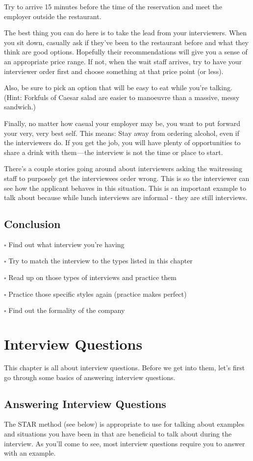 \documentclass{article}
\begin{document}
Try to arrive 15 minutes before the time of the reservation and meet the
employer outside the restaurant.

The best thing you can do here is to take the lead from your
interviewers. When you sit down, casually ask if they've been to the
restaurant before and what they think are good options. Hopefully their
recommendations will give you a sense of an appropriate price range. If
not, when the wait staff arrives, try to have your interviewer order
first and choose something at that price point (or less).

Also, be sure to pick an option that will be easy to eat while you're
talking. (Hint: Forkfuls of Caesar salad are easier to manoeuvre than a
massive, messy sandwich.)

Finally, no matter how casual your employer may be, you want to put
forward your very, very best self. This means: Stay away from ordering
alcohol, even if the interviewers do. If you get the job, you will have
plenty of opportunities to share a drink with them --- the interview is
not the time or place to start.

There's a couple stories going around about interviewers asking the
waitressing staff to purposely get the interviewees order wrong. This is
so the interviewer can see how the applicant behaves in this situation.
This is an important example to talk about because while lunch
interviews are informal - they are still interviews.
\subsection{Conclusion}
$\square$ Find out what interview you're having

$\square$ Try to match the interview to the types listed in this chapter

$\square$ Read up on those types of interviews and practice them

$\square$ Practice those specific styles again (practice makes perfect)

$\square$ Find out the formality of the company
\newpage
\section{Interview Questions}
This chapter is all about interview questions. Before we get into them,
let's first go through some basics of answering interview questions.

\subsection{Answering Interview Questions}
The STAR method (see below) is appropriate to use for talking about
examples and situations you have been in that are beneficial to talk
about during the interview. As you'll come to see, most interview
questions require you to answer with an example.
\end{document}
